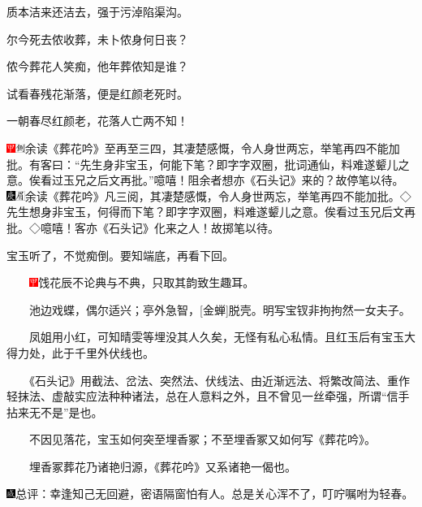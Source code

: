质本洁来还洁去，强于污淖陷渠沟。

尔今死去侬收葬，未卜侬身何日丧？

侬今葬花人笑痴，他年葬侬知是谁？

试看春残花渐落，便是红颜老死时。

一朝春尽红颜老，花落人亡两不知！

{{\includegraphics[width=3mm]{../Images/00002}\includegraphics[width=3mm]{../Images/00011}\footnotesize \kaishu 余读《葬花吟》至再至三四，其凄楚感慨，令人身世两忘，举笔再四不能加批。有客曰：``先生身非宝玉，何能下笔？即字字双圈，批词通仙，料难遂颦儿之意。俟看过玉兄之后文再批。''噫嘻！阻余者想亦《石头记》来的？故停笔以待。　\includegraphics[width=3mm]{../Images/00004}\includegraphics[width=3mm]{../Images/00010}\footnotesize \kaishu 余读《葬花吟》凡三阅，其凄楚感慨，令人身世两忘，举笔再四不能加批。◇先生想身非宝玉，何得而下笔？即字字双圈，料难遂颦儿之意。俟看过玉兄后文再批。◇噫嘻！客亦《石头记》化来之人！故掷笔以待。}}

宝玉听了，不觉痴倒。要知端底，再看下回。

{　　\includegraphics[width=3mm]{../Images/00002}饯花辰不论典与不典，只取其韵致生趣耳。}

{　　池边戏蝶，偶尔适兴；亭外急智，{[}金蝉{]}脱壳。明写宝钗非拘拘然一女夫子。}

{　　凤姐用小红，可知晴雯等埋没其人久矣，无怪有私心私情。且红玉后有宝玉大得力处，此于千里外伏线也。}

{　　《石头记》用截法、岔法、突然法、伏线法、由近渐远法、将繁改简法、重作轻抹法、虚敲实应法种种诸法，总在人意料之外，且不曾见一丝牵强，所谓``信手拈来无不是''是也。}

{　　不因见落花，宝玉如何突至埋香冢；不至埋香冢又如何写《葬花吟》。}

{　　埋香冢葬花乃诸艳归源，《葬花吟》又系诸艳一偈也。}

{\includegraphics[width=3mm]{../Images/00005}总评：幸逢知己无回避，密语隔窗怕有人。总是关心浑不了，叮咛嘱咐为轻春。}

